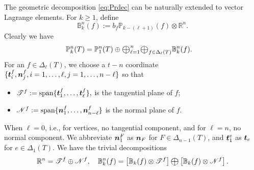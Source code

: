 \documentclass[mathpazo]{cicp}
\newcommand{\Oplus}{\ensuremath{\vcenter{\hbox{\scalebox{1.5}{$\oplus$}}}}}
\begin{document}
The geometric decomposition \eqref{eq:Prdec} can be naturally extended to vector Lagrange
elements. For $k\geq 1$, define 
\begin{equation*}
\mathbb B_{k}^n(f) := b_f\mathbb P_{k - (\ell +1)} (f)\otimes \mathbb R^n.
\end{equation*}
%
Clearly we have
\begin{align}\label{eq:Pkvecdec}
\mathbb P_k^n(T)&= \mathbb P_1^n(T)\oplus \Oplus_{\ell = 1}^n\Oplus_{f\in \Delta_{\ell}(T)} \mathbb B_{k}^n(f).
\end{align}
For an $f\in \Delta_{\ell} (T)$, we choose a $t-n$ coordinate 
$\{\boldsymbol t_i^f, \boldsymbol n_j^f, i=1, \dots, \ell, j = 1, \dots, n-\ell\}$ so that
\begin{itemize}
\item $\mathscr T^f := \textrm{span}\{ \boldsymbol t_1^f, \ldots, \boldsymbol t_{\ell}^f \}, $ is the tangential plane of $f$;

\item $\mathscr{N}^f :=  \textrm{span}\{ \boldsymbol n_1^f, \ldots, \boldsymbol n_{n - \ell}^f \} $ is the normal plane of $f$. 
\end{itemize}
%
When $\ell = 0$, i.e., for vertices, no tangential component, and for $\ell = n$, no normal component. 
We abbreviate $\boldsymbol n_1^F$ as $\boldsymbol n_F$ for $F\in\Delta_{n-1}(T)$, and $\boldsymbol t_1^e$ as $\boldsymbol t_e$ for $e\in\Delta_{1}(T)$.
We have the trivial decompositions
\begin{equation}\label{eq:tndec}
\mathbb R^n = \mathscr T^{f}\oplus \mathscr N^f, \quad \mathbb B_{k}^n(f) = \left [\mathbb B_{k}(f)\otimes \mathscr T^{f}\right ]\Oplus \left [\mathbb B_{k}(f)\otimes\mathscr N^f \right ].
\end{equation}
\end{document}
